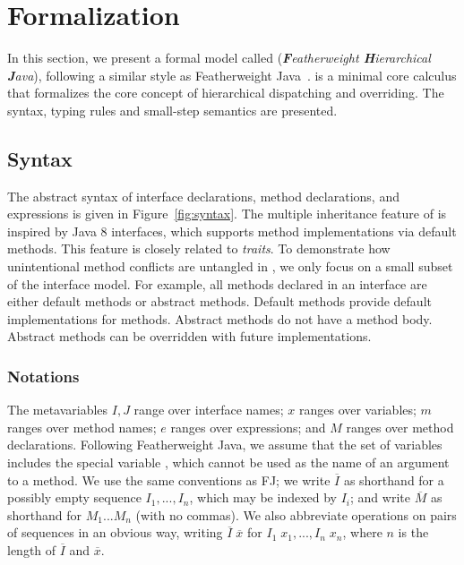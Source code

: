 \section{Formalization}\label{sec:formalization}
In this section, we present a formal model called \MIM{} (\emph{\textbf{F}eatherweight \textbf{H}ierarchical \textbf{J}ava}), following a similar style as  
Featherweight Java~\cite{Igarashi01FJ}. \MIM{} is a minimal core calculus that formalizes the core concept of hierarchical dispatching and overriding. The syntax, typing rules and small-step semantics are presented.

\subsection{Syntax}
The abstract syntax of \MIM{} interface declarations, method declarations, and expressions is given in Figure~\ref{fig:syntax}. The multiple
inheritance feature of \MIM{} is inspired by Java 8 interfaces, which supports
method implementations via default methods. This feature is 
closely related to \emph{traits}. To demonstrate how
unintentional method conflicts are untangled in \MIM{}, we only focus on a small subset of the interface model. For example, all methods declared
in an interface are either default methods or abstract methods. Default methods provide default implementations for methods. Abstract methods do not
have a method body. Abstract methods can be overridden with future implementations.

\subsubsection{Notations}
The metavariables $I, J$ range over interface names; $x$ ranges over variables; $m$ ranges over method names; $e$ ranges over expressions; and $M$ ranges over method declarations. Following Featherweight Java, we assume that the set of variables includes the special variable \kwthis, which cannot be used as the name of an argument to a method. We use the same
conventions as FJ; we write $\overline{I}$ as shorthand for a possibly empty sequence $I_1, ..., I_n$, which may be indexed by $I_i$; and write $\overline{M}$ as shorthand for $M_1 ... M_n$ (with no commas). We also abbreviate operations on pairs of sequences in an obvious way, writing $\overline{I} \; \overline{x}$ for $I_1 \; x_1, ..., I_n \; x_n$, where $n$ is the length of $\overline{I}$ and $\overline{x}$.

